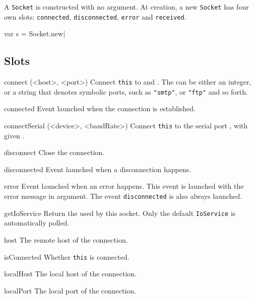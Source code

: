 A \lstinline|Socket| is constructed with no argument. At creation, a
new \lstinline|Socket| has four own slots: \lstinline|connected|,
\lstinline|disconnected|, \lstinline|error| and \lstinline|received|.

\begin{urbiscript}
var s = Socket.new|
\end{urbiscript}

\subsection{Slots}
\begin{urbiscriptapi}

\item[connect](<host>, <port>)%
  Connect \lstinline|this| to  and .  The
   can be either an integer, or a string that denotes
  symbolic ports, such as \lstinline|"smtp"|, or \lstinline|"ftp"| and
  so forth.

\item[connected]
  Event launched when the connection is established.

\item[connectSerial](<device>, <baudRate>)%
  Connect \lstinline|this| to the serial port , with given
  .

\item[disconnect]
  Close the connection.

\item[disconnected]
  Event launched when a disconnection happens.

\item[error]
  Event launched when an error happens. This event is launched with
  the error message in argument. The event \lstinline|disconnected| is
  also always launched.

\item[getIoService]
  Return the  used by this socket. Only the default
  \lstinline|IoService| is automatically polled.

\item[host]
  The remote host of the connection.

\item[isConnected]
  Whether \lstinline|this| is connected.

\item[localHost]
  The local host of the connection.

\item[localPort]
  The local port of the connection.


\end{urbiscriptapi}
